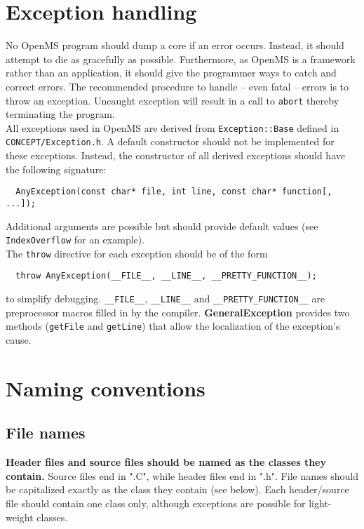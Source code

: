 \documentclass[a4]{article}
\begin{document}
\section{Exception handling}

No OpenMS program should dump a core if an error occurs. Instead, it should
attempt to die as gracefully as possible. Furthermore, as OpenMS is a
framework rather than an application, it should give the programmer ways to
catch and correct errors.
The recommended procedure to handle -- even fatal -- errors is to throw an exception. Uncaught
exception will result in a call to {\tt abort} thereby terminating the
program.\\
All exceptions used in OpenMS are derived from \texttt{Exception::Base}
defined in \texttt{CONCEPT/Exception.h}. A default constructor should not be
implemented for these exceptions. Instead, the constructor of all derived
exceptions should have the following signature:
\begin{verbatim}
  AnyException(const char* file, int line, const char* function[, ...]);
\end{verbatim}
Additional arguments are possible but should provide default values (see
{\tt IndexOverflow} for an example).\\
The {\tt throw} directive for each exception should be of the form
\begin{verbatim}
  throw AnyException(__FILE__, __LINE__, __PRETTY_FUNCTION__);
\end{verbatim}
to simplify debugging. {\tt \_\_FILE\_\_}, {\tt \_\_LINE\_\_} and {\tt \_\_PRETTY\_FUNCTION\_\_} are preprocessor
macros filled in by the compiler. {\bf GeneralException} provides two methods
({\tt getFile} and {\tt getLine}) that allow the localization of the
exception's cause.\\

\section{Naming conventions}

\subsection{File names}
{\bf Header files and source files should be named as the classes they
contain.}
Source files end in ".C", while header files end in ".h". File names should be
capitalized exactly as the class they contain (see below). Each header/source
file should contain one class only, although exceptions are possible for
light-weight classes.
\end{document}
